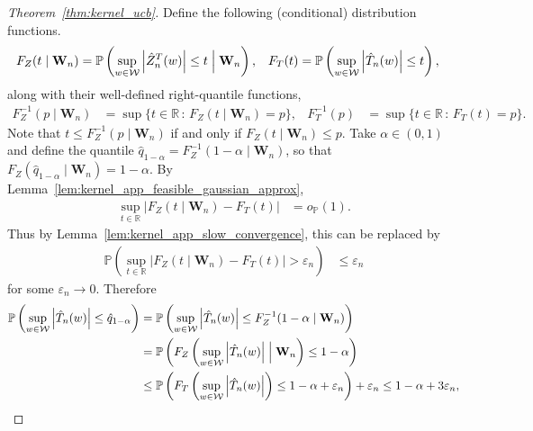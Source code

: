 \documentclass[11pt,lof]{puthesis}
\renewcommand{\P}{\ensuremath{\mathbb{P}}}
\newcommand{\R}{\ensuremath{\mathbb{R}}}
\newcommand{\bW}{\ensuremath{\mathbf{W}}}
\newcommand{\cW}{\ensuremath{\mathcal{W}}}
\theoremstyle{break}
\theoremstyle{proof}
\newtheorem{proof}{Proof}
\begin{document}
\begin{proof}[Theorem~\ref{thm:kernel_ucb}]
  Define the following (conditional) distribution functions.
  \begin{align*}
    F_Z(t \mid \bW_n)
    &=
    \P\left(
      \sup_{w \in \cW}
      \left| \hat Z_n^T(w) \right|
      \leq t
      \Bigm\vert \bW_n
    \right),
    &F_T(t)
    &=
    \P\left(
      \sup_{w \in \cW}
      \left| \hat T_n(w) \right|
      \leq t
    \right),
  \end{align*}
  along with their well-defined right-quantile functions,
  \begin{align*}
    F_Z^{-1}(p \mid \bW_n)
    &=
    \sup
    \big\{
      t \in \R
      \, : \,
      F_Z(t \mid \bW_n)
      = p
    \big\},
    &F_T^{-1}(p)
    &=
    \sup
    \big\{
      t \in \R
      \, : \,
      F_T(t)
      = p
    \big\}.
  \end{align*}
  Note that
  $t \leq F_Z^{-1}(p \mid \bW_n)$
  if and only if
  $F_Z(t \mid \bW_n) \leq p$.
  Take $\alpha \in (0,1)$ and
  define the quantile
  $\hat q_{1-\alpha} = F_Z^{-1}(1-\alpha \mid \bW_n)$,
  so that
  $F_Z(\hat q_{1-\alpha} \mid \bW_n) = 1-\alpha$.
  By Lemma~\ref{lem:kernel_app_feasible_gaussian_approx},
  \begin{align*}
    \sup_{t \in \R}
    \big|
    F_Z(t \mid \bW_n) - F_T(t)
    \big|
    &=
    o_\P(1).
  \end{align*}
  Thus by Lemma~\ref{lem:kernel_app_slow_convergence},
  this can be replaced by
  \begin{align*}
    \P\left(
      \sup_{t \in \R} \big| F_Z(t \mid \bW_n) - F_T(t) \big|
      > \varepsilon_n
    \right)
    &\leq \varepsilon_n
  \end{align*}
  for some $\varepsilon_n \to 0$.
  Therefore
  \begin{align*}
    \P\left(
      \sup_{w \in \cW}
      \left|
      \hat T_n(w)
      \right|
      \leq
      \hat q_{1-\alpha}
    \right)
    &=
    \P\left(
      \sup_{w \in \cW}
      \left|
      \hat T_n(w)
      \right|
      \leq
      F_Z^{-1}(1-\alpha \mid \bW_n)
    \right) \\
    &=
    \P\left(
      F_Z\left(
        \sup_{w \in \cW}
        \left|
        \hat T_n(w)
        \right|
        \Bigm\vert \bW_n
      \right)
      \leq
      1 - \alpha
    \right) \\
    &\leq
    \P\left(
      F_T\left(
        \sup_{w \in \cW}
        \left|
        \hat T_n(w)
        \right|
      \right)
      \leq
      1 - \alpha + \varepsilon_n
    \right)
    + \varepsilon_n
    \leq 1 - \alpha + 3\varepsilon_n,

\end{align*}
\end{proof}
\end{document}

